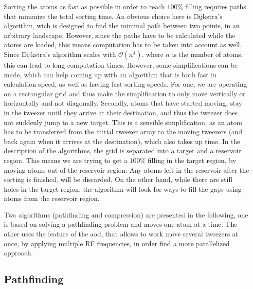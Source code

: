 Sorting the atoms as fast as possible in order to reach $100\%$ filling requires paths that minimize the total sorting time. An obvious choice here is Dijkstra's algorithm, wich is designed to find the minimal path between two points, in an arbitrary landscape. However, since the paths have to be calculated while the atoms are loaded, this means computation has to be taken into account as well. Since Dijkstra's algorithm scales with $\mathcal{O}(n^4)$, where $n$ is the number of atoms, this can lead to long computation times. However, some simplifications can be made, which can help coming up with an algorithm that is both fast in calculation speed, as well as having fast sorting speeds.
For one, we are operating on a rectangular grid and thus make the simplification to only move vertically or horizontally and not diagonally. Secondly, atoms that have started moving, stay in the tweezer until they arrive at their destination, and thus the tweezer does not suddenly jump to a new target. This is a sensible simplification, as an atom has to be transferred from the initial tweezer array to the moving tweezers (and back again when it arrives at the destination), which also takes up time. In the description of the algorithms, the grid is separated into a target and a reservoir region. This means we are trying to get a $100\%$ filling in the target region, by moving atoms out of the reservoir region. Any atoms left in the reservoir after the sorting is finished, will be discarded. On the other hand, while there are still holes in the target region, the algorithm will look for ways to fill the gaps using atoms from the reservoir region.

Two algorithms (pathfinding and compression) are presented in the following, one is based on solving a pathfinding problem and moves one atom at a time. The other uses the feature of the \ac{aod}, that allows to work move several tweezers at once, by applying multiple RF frequencies, in order find a more parallelized approach.


\subsection{Pathfinding}

